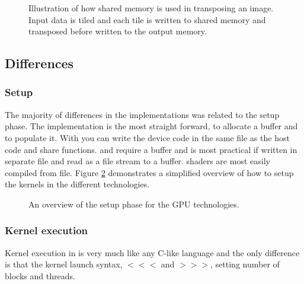 \begin{figure}
	\centering
	
	\caption{Illustration of how shared memory is used in transposing an image. Input data is tiled and each tile is written to shared memory and transposed before written to the output memory. }
	\label{fig:transpose-memory}
\end{figure}

\subsection{Differences}%
\subsubsection{Setup}%
The majority of differences in the implementations was related to the setup phase. The {\CU} implementation is the most straight forward,  to allocate a buffer and  to populate it. With {\CU} you can write the device code in the same file as the host code and share functions. {\OCL} and {\GL} require a  buffer and is most practical if written in separate file and read as a file stream to a  buffer. {\DX} shaders are most easily compiled from file. Figure \ref{fig:code:setup} demonstrates a simplified overview of how to setup the kernels in the different technologies.%
\begin{figure}%
	\centering%
	\def \setupWidth {\textwidth / 2 - 18pt}%
	\hfill%
	\vfill%
	\hfill%
	\caption{An overview of the setup phase for the \gls{GPU} technologies.}%
	\label{fig:code:setup}%
\end{figure}%

\subsubsection{Kernel execution}

Kernel execution in {\CU} is very much like any C-like language and the only difference is that the kernel launch syntax, $<<<$ and $>>>$, setting number of blocks and threads.

